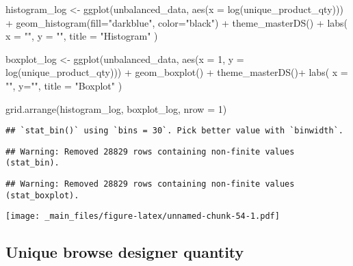 \documentclass[
]{book}
\newenvironment{Shaded}{\begin{snugshade}}{\end{snugshade}}
\newcommand{\AttributeTok}[1]{\textcolor[rgb]{0.77,0.63,0.00}{#1}}
\newcommand{\DecValTok}[1]{\textcolor[rgb]{0.00,0.00,0.81}{#1}}
\newcommand{\FunctionTok}[1]{\textcolor[rgb]{0.00,0.00,0.00}{#1}}
\newcommand{\NormalTok}[1]{#1}
\newcommand{\OtherTok}[1]{\textcolor[rgb]{0.56,0.35,0.01}{#1}}
\newcommand{\SpecialCharTok}[1]{\textcolor[rgb]{0.00,0.00,0.00}{#1}}
\newcommand{\StringTok}[1]{\textcolor[rgb]{0.31,0.60,0.02}{#1}}
\begin{document}
\begin{Shaded}
\begin{Highlighting}[]
\NormalTok{histogram\_log }\OtherTok{\textless{}{-}} \FunctionTok{ggplot}\NormalTok{(unbalanced\_data, }\FunctionTok{aes}\NormalTok{(}\AttributeTok{x =} \FunctionTok{log}\NormalTok{(unique\_product\_qty))) }\SpecialCharTok{+}
    \FunctionTok{geom\_histogram}\NormalTok{(}\AttributeTok{fill=}\StringTok{"darkblue"}\NormalTok{, }\AttributeTok{color=}\StringTok{"black"}\NormalTok{) }\SpecialCharTok{+}
    \FunctionTok{theme\_masterDS}\NormalTok{() }\SpecialCharTok{+}
    \FunctionTok{labs}\NormalTok{(}
      \AttributeTok{x =} \StringTok{""}\NormalTok{,}
      \AttributeTok{y =} \StringTok{""}\NormalTok{,}
      \AttributeTok{title =} \StringTok{"Histogram"}
\NormalTok{    )}
  
\NormalTok{  boxplot\_log }\OtherTok{\textless{}{-}} \FunctionTok{ggplot}\NormalTok{(unbalanced\_data, }\FunctionTok{aes}\NormalTok{(}\AttributeTok{x =} \DecValTok{1}\NormalTok{, }\AttributeTok{y =} \FunctionTok{log}\NormalTok{(unique\_product\_qty))) }\SpecialCharTok{+}
    \FunctionTok{geom\_boxplot}\NormalTok{() }\SpecialCharTok{+}
    \FunctionTok{theme\_masterDS}\NormalTok{()}\SpecialCharTok{+}
    \FunctionTok{labs}\NormalTok{(}
      \AttributeTok{x =} \StringTok{""}\NormalTok{,}
      \AttributeTok{y=}\StringTok{""}\NormalTok{,}
      \AttributeTok{title =} \StringTok{"Boxplot"}
\NormalTok{    )}

  \FunctionTok{grid.arrange}\NormalTok{(histogram\_log, boxplot\_log, }\AttributeTok{nrow =} \DecValTok{1}\NormalTok{)}
\end{Highlighting}
\end{Shaded}

\begin{verbatim}
## `stat_bin()` using `bins = 30`. Pick better value with `binwidth`.
\end{verbatim}

\begin{verbatim}
## Warning: Removed 28829 rows containing non-finite values (stat_bin).
\end{verbatim}

\begin{verbatim}
## Warning: Removed 28829 rows containing non-finite values (stat_boxplot).
\end{verbatim}

\texttt{[image: \_main\_files/figure-latex/unnamed-chunk-54-1.pdf]}

\hypertarget{unique-browse-designer-quantity}{%
\subsection{Unique browse designer quantity}\label{unique-browse-designer-quantity}}
\end{document}
